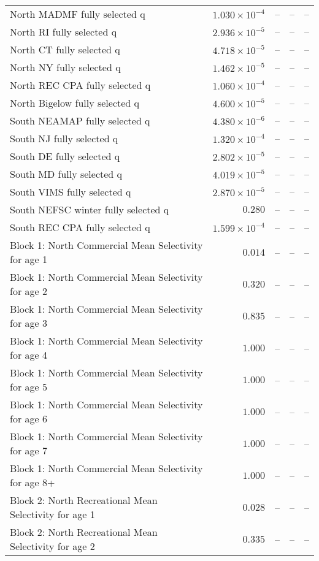 \documentclass[
]{article}
\begin{document}
\begin{landscape}
\begin{longtable}[t]{lrrrr}
North MADMF fully selected q & $1.030\times 10^{-4}$ & -- & -- & --\\
North RI fully selected q & $2.936\times 10^{-5}$ & -- & -- & --\\
North CT fully selected q & $4.718\times 10^{-5}$ & -- & -- & --\\
\addlinespace
North NY fully selected q & $1.462\times 10^{-5}$ & -- & -- & --\\
North REC CPA fully selected q & $1.060\times 10^{-4}$ & -- & -- & --\\
North Bigelow fully selected q & $4.600\times 10^{-5}$ & -- & -- & --\\
South NEAMAP fully selected q & $4.380\times 10^{-6}$ & -- & -- & --\\
South NJ fully selected q & $1.320\times 10^{-4}$ & -- & -- & --\\
\addlinespace
South DE fully selected q & $2.802\times 10^{-5}$ & -- & -- & --\\
South MD fully selected q & $4.019\times 10^{-5}$ & -- & -- & --\\
South VIMS fully selected q & $2.870\times 10^{-5}$ & -- & -- & --\\
South NEFSC winter fully selected q & $0.280$ & -- & -- & --\\
South REC CPA fully selected q & $1.599\times 10^{-4}$ & -- & -- & --\\
\addlinespace
Block 1: North Commercial Mean Selectivity for age 1 & $0.014$ & -- & -- & --\\
Block 1: North Commercial Mean Selectivity for age 2 & $0.320$ & -- & -- & --\\
Block 1: North Commercial Mean Selectivity for age 3 & $0.835$ & -- & -- & --\\
Block 1: North Commercial Mean Selectivity for age 4 & $1.000$ & -- & -- & --\\
Block 1: North Commercial Mean Selectivity for age 5 & $1.000$ & -- & -- & --\\
\addlinespace
Block 1: North Commercial Mean Selectivity for age 6 & $1.000$ & -- & -- & --\\
Block 1: North Commercial Mean Selectivity for age 7 & $1.000$ & -- & -- & --\\
Block 1: North Commercial Mean Selectivity for age 8+ & $1.000$ & -- & -- & --\\
Block 2: North Recreational Mean Selectivity for age 1 & $0.028$ & -- & -- & --\\
Block 2: North Recreational Mean Selectivity for age 2 & $0.335$ & -- & -- & --\\

\end{longtable}
\end{landscape}
\end{document}
